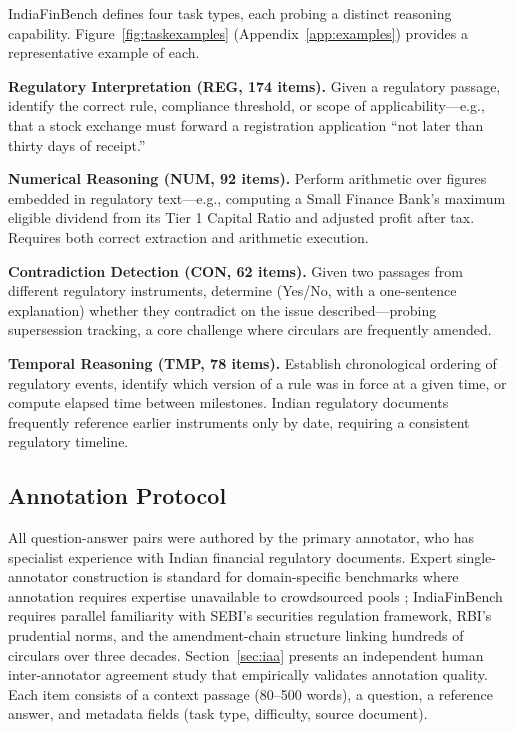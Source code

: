 \documentclass[11pt]{article}
\begin{document}
IndiaFinBench defines four task types, each probing a distinct reasoning capability. Figure~\ref{fig:taskexamples} (Appendix~\ref{app:examples}) provides a representative example of each.

\textbf{Regulatory Interpretation (REG, 174 items).} Given a regulatory passage, identify the correct rule, compliance threshold, or scope of applicability---e.g., that a stock exchange must forward a registration application ``not later than thirty days of receipt.''

\textbf{Numerical Reasoning (NUM, 92 items).} Perform arithmetic over figures embedded in regulatory text---e.g., computing a Small Finance Bank's maximum eligible dividend from its Tier 1 Capital Ratio and adjusted profit after tax. Requires both correct extraction and arithmetic execution.

\textbf{Contradiction Detection (CON, 62 items).} Given two passages from different regulatory instruments, determine (Yes/No, with a one-sentence explanation) whether they contradict on the issue described---probing supersession tracking, a core challenge where circulars are frequently amended.

\textbf{Temporal Reasoning (TMP, 78 items).} Establish chronological ordering of regulatory events, identify which version of a rule was in force at a given time, or compute elapsed time between milestones. Indian regulatory documents frequently reference earlier instruments only by date, requiring a consistent regulatory timeline.

\subsection{Annotation Protocol}

All question-answer pairs were authored by the primary annotator, who has specialist experience with Indian financial regulatory documents. Expert single-annotator construction is standard for domain-specific benchmarks where annotation requires expertise unavailable to crowdsourced pools \citep{hendrycks2021cuad, malik2021ildc, islam2023financebench}; IndiaFinBench requires parallel familiarity with SEBI's securities regulation framework, RBI's prudential norms, and the amendment-chain structure linking hundreds of circulars over three decades. Section~\ref{sec:iaa} presents an independent human inter-annotator agreement study that empirically validates annotation quality. Each item consists of a context passage (80--500 words), a question, a reference answer, and metadata fields (task type, difficulty, source document).
\end{document}
